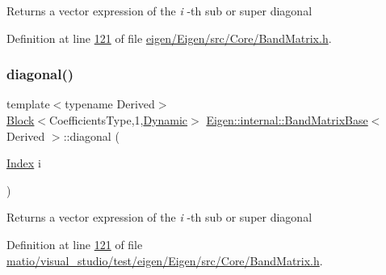 \begin{DoxyReturn}{Returns}
a vector expression of the {\itshape i} -\/th sub or super diagonal 
\end{DoxyReturn}


Definition at line \hyperlink{eigen_2_eigen_2src_2_core_2_band_matrix_8h_source_l00121}{121} of file \hyperlink{eigen_2_eigen_2src_2_core_2_band_matrix_8h_source}{eigen/\+Eigen/src/\+Core/\+Band\+Matrix.\+h}.

\mbox{\label{class_eigen_1_1internal_1_1_band_matrix_base_a51ce12f0be57b0c2593c20c865de6af1}} 
\subsubsection{\texorpdfstring{diagonal()}{diagonal()}\hspace{0.1cm}{\footnotesize\ttfamily [10/12]}}
{\footnotesize\ttfamily template$<$typename Derived$>$ \\
\hyperlink{group___core___module_class_eigen_1_1_block}{Block}$<$Coefficients\+Type,1,\hyperlink{namespace_eigen_ad81fa7195215a0ce30017dfac309f0b2}{Dynamic}$>$ \hyperlink{class_eigen_1_1internal_1_1_band_matrix_base}{Eigen\+::internal\+::\+Band\+Matrix\+Base}$<$ Derived $>$\+::diagonal (\begin{DoxyParamCaption}\item[{\hyperlink{group___core___module_a554f30542cc2316add4b1ea0a492ff02}{Index}}]{i }\end{DoxyParamCaption})\hspace{0.3cm}{\ttfamily [inline]}}

\begin{DoxyReturn}{Returns}
a vector expression of the {\itshape i} -\/th sub or super diagonal 
\end{DoxyReturn}


Definition at line \hyperlink{matio_2visual__studio_2test_2eigen_2_eigen_2src_2_core_2_band_matrix_8h_source_l00121}{121} of file \hyperlink{matio_2visual__studio_2test_2eigen_2_eigen_2src_2_core_2_band_matrix_8h_source}{matio/visual\+\_\+studio/test/eigen/\+Eigen/src/\+Core/\+Band\+Matrix.\+h}.

\mbox{\label{class_eigen_1_1internal_1_1_band_matrix_base_a8f7146e80405018d6d0827c4a7713ad3}} 
